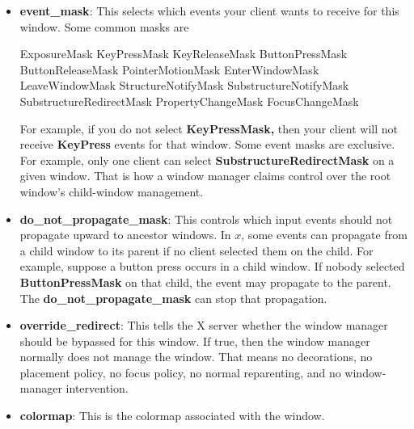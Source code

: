 \documentclass{report}
\begin{document}
\begin{itemize}
\begin{itemize}
                    Like backing store, this is only a hint. The server may ignore it.
                \item \textbf{event\_mask}: This selects which events your client wants to receive for this window.
                    \bigbreak \noindent 
                    Some common masks are
                    \bigbreak \noindent 
                    \begin{cppcode}
                        ExposureMask
                        KeyPressMask
                        KeyReleaseMask
                        ButtonPressMask
                        ButtonReleaseMask
                        PointerMotionMask
                        EnterWindowMask
                        LeaveWindowMask
                        StructureNotifyMask
                        SubstructureNotifyMask
                        SubstructureRedirectMask
                        PropertyChangeMask
                        FocusChangeMask
                    \end{cppcode}
                    \bigbreak \noindent 
                    For example, if you do not select \textbf{KeyPressMask,} then your client will not receive \textbf{KeyPress} events for that window.
                    \bigbreak \noindent 
                    Some event masks are exclusive. For example, only one client can select \textbf{SubstructureRedirectMask} on a given window. That is how a window manager claims control over the root window’s child-window management.
                \item \textbf{do\_not\_propagate\_mask}: This controls which input events should not propagate upward to ancestor windows.
                    \bigbreak \noindent 
                    In $x$, some events can propagate from a child window to its parent if no client selected them on the child.
                    \bigbreak \noindent 
                    For example, suppose a button press occurs in a child window. If nobody selected \textbf{ButtonPressMask} on that child, the event may propagate to the parent.
                    \bigbreak \noindent 
                    The \textbf{do\_not\_propagate\_mask} can stop that propagation.
                \item \textbf{override\_redirect}: This tells the X server whether the window manager should be bypassed for this window. If true, then the window manager normally does not manage the window. That means no decorations, no placement policy, no focus policy, no normal reparenting, and no window-manager intervention.
                \item \textbf{colormap}: This is the colormap associated with the window.

\end{itemize}
\end{itemize}
\end{document}
